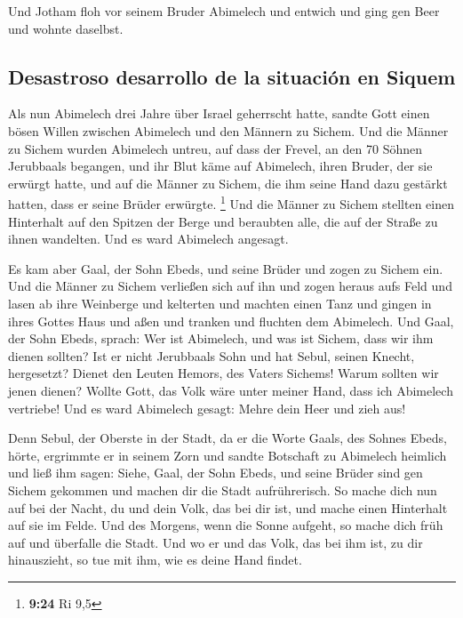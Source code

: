  Und Jotham floh vor seinem Bruder Abimelech und entwich
und ging gen Beer und wohnte daselbst.

\hypertarget{desastroso-desarrollo-de-la-situaciuxf3n-en-siquem}{%
\subsection{Desastroso desarrollo de la situación en
Siquem}\label{desastroso-desarrollo-de-la-situaciuxf3n-en-siquem}}

 Als nun Abimelech drei Jahre über Israel geherrscht
hatte,  sandte Gott einen bösen Willen zwischen Abimelech
und den Männern zu Sichem. Und die Männer zu Sichem wurden Abimelech
untreu,  auf dass der Frevel, an den 70 Söhnen Jerubbaals
begangen, und ihr Blut käme auf Abimelech, ihren Bruder, der sie erwürgt
hatte, und auf die Männer zu Sichem, die ihm seine Hand dazu gestärkt
hatten, dass er seine Brüder erwürgte. \footnote{\textbf{9:24} Ri 9,5}
 Und die Männer zu Sichem stellten einen Hinterhalt auf
den Spitzen der Berge und beraubten alle, die auf der Straße zu ihnen
wandelten. Und es ward Abimelech angesagt.

 Es kam aber Gaal, der Sohn Ebeds, und seine Brüder und
zogen zu Sichem ein. Und die Männer zu Sichem verließen sich auf ihn
 und zogen heraus aufs Feld und lasen ab ihre Weinberge
und kelterten und machten einen Tanz und gingen in ihres Gottes Haus und
aßen und tranken und fluchten dem Abimelech.  Und Gaal,
der Sohn Ebeds, sprach: Wer ist Abimelech, und was ist Sichem, dass wir
ihm dienen sollten? Ist er nicht Jerubbaals Sohn und hat Sebul, seinen
Knecht, hergesetzt? Dienet den Leuten Hemors, des Vaters Sichems! Warum
sollten wir jenen dienen?  Wollte Gott, das Volk wäre
unter meiner Hand, dass ich Abimelech vertriebe! Und es ward Abimelech
gesagt: Mehre dein Heer und zieh aus!

 Denn Sebul, der Oberste in der Stadt, da er die Worte
Gaals, des Sohnes Ebeds, hörte, ergrimmte er in seinem Zorn
 und sandte Botschaft zu Abimelech heimlich und ließ ihm
sagen: Siehe, Gaal, der Sohn Ebeds, und seine Brüder sind gen Sichem
gekommen und machen dir die Stadt aufrührerisch.  So
mache dich nun auf bei der Nacht, du und dein Volk, das bei dir ist, und
mache einen Hinterhalt auf sie im Felde.  Und des
Morgens, wenn die Sonne aufgeht, so mache dich früh auf und überfalle
die Stadt. Und wo er und das Volk, das bei ihm ist, zu dir hinauszieht,
so tue mit ihm, wie es deine Hand findet.

